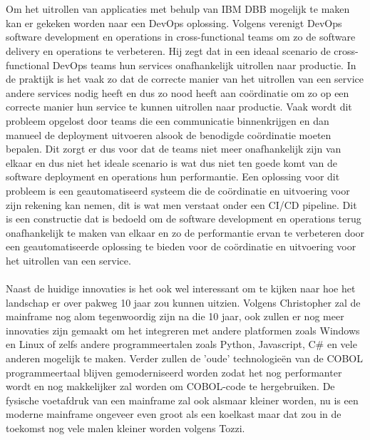 \\ \\
Om het uitrollen van applicaties met behulp van IBM DBB mogelijk te maken kan er gekeken worden naar een DevOps oplossing.
Volgens \textcite{Sokolowksi2021} verenigt DevOps software development en operations in cross-functional teams om zo de software delivery en operations te verbeteren.
Hij zegt dat in een ideaal scenario de cross-functional DevOps teams hun services onafhankelijk uitrollen naar productie. 
In de praktijk is het vaak zo dat de correcte manier van het uitrollen van een service andere services nodig heeft en dus zo nood heeft aan coördinatie om zo op een correcte manier hun service te kunnen uitrollen naar productie. 
Vaak wordt dit probleem opgelost door teams die een communicatie binnenkrijgen en dan manueel de deployment uitvoeren alsook de benodigde coördinatie moeten bepalen.
Dit zorgt er dus voor dat de teams niet meer onafhankelijk zijn van elkaar en dus niet het ideale scenario is wat dus niet ten goede komt van de software deployment en operations hun performantie. 
Een oplossing voor dit probleem is een geautomatiseerd systeem die de coördinatie en uitvoering voor zijn rekening kan nemen, dit is wat men verstaat onder een CI/CD pipeline. 
Dit is een constructie dat is bedoeld om de software development en operations terug onafhankelijk te maken van elkaar en zo de performantie ervan te verbeteren door een geautomatiseerde oplossing te bieden voor de coördinatie en uitvoering voor het uitrollen van een service. \autocite{Sokolowksi2021}
\\ \\
Naast de huidige innovaties is het ook wel interessant om te kijken naar hoe het landschap er over pakweg 10 jaar zou kunnen uitzien. 
Volgens Christopher \textcite{Tozzi2022} zal de mainframe nog alom tegenwoordig zijn na die 10 jaar, ook zullen er nog meer innovaties zijn gemaakt om het integreren met andere platformen zoals Windows en Linux of zelfs andere programmeertalen zoals Python, 
Javascript, C# en vele anderen mogelijk te maken. 
Verder zullen de 'oude' technologieën van de COBOL programmeertaal blijven gemoderniseerd worden zodat het nog performanter wordt en nog makkelijker zal worden om COBOL-code te hergebruiken. De fysische voetafdruk van een mainframe zal ook alsmaar kleiner worden, 
nu is een moderne mainframe ongeveer even groot als een koelkast maar dat zou in de toekomst nog vele malen kleiner worden volgens Tozzi. \autocite{Tozzi2022}



